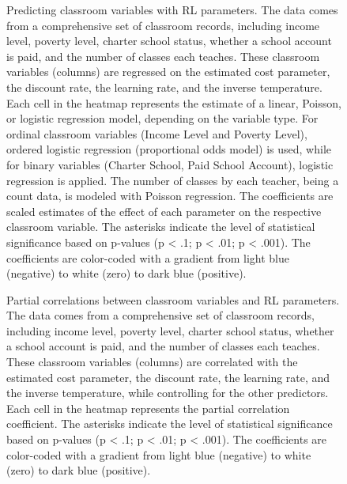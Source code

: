 \documentclass[
  number,
  preprint,
  3p,
  onecolumn]{elsarticle}
\begin{document}
\begin{figure}


\caption{\label{fig-heterogeneity-reg}Predicting classroom variables
with RL parameters. The data comes from a comprehensive set of classroom
records, including income level, poverty level, charter school status,
whether a school account is paid, and the number of classes each
teaches. These classroom variables (columns) are regressed on the
estimated cost parameter, the discount rate, the learning rate, and the
inverse temperature. Each cell in the heatmap represents the estimate of
a linear, Poisson, or logistic regression model, depending on the
variable type. For ordinal classroom variables (Income Level and Poverty
Level), ordered logistic regression (proportional odds model) is used,
while for binary variables (Charter School, Paid School Account),
logistic regression is applied. The number of classes by each teacher,
being a count data, is modeled with Poisson regression. The coefficients
are scaled estimates of the effect of each parameter on the respective
classroom variable. The asterisks indicate the level of statistical
significance based on p-values (p \textless{} .1; p \textless{} .01; p
\textless{} .001). The coefficients are color-coded with a gradient from
light blue (negative) to white (zero) to dark blue (positive).}

\end{figure}%

\begin{figure}


\caption{\label{fig-heterogeneity-pcor}Partial correlations between
classroom variables and RL parameters. The data comes from a
comprehensive set of classroom records, including income level, poverty
level, charter school status, whether a school account is paid, and the
number of classes each teaches. These classroom variables (columns) are
correlated with the estimated cost parameter, the discount rate, the
learning rate, and the inverse temperature, while controlling for the
other predictors. Each cell in the heatmap represents the partial
correlation coefficient. The asterisks indicate the level of statistical
significance based on p-values (p \textless{} .1; p \textless{} .01; p
\textless{} .001). The coefficients are color-coded with a gradient from
light blue (negative) to white (zero) to dark blue (positive).}

\end{figure}%
\end{document}

